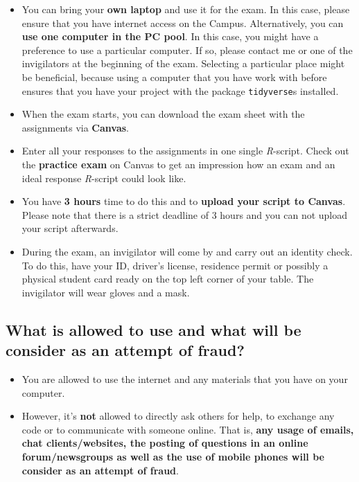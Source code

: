 \documentclass[
]{scrartcl}
\providecommand{\tightlist}{%
  \setlength{\itemsep}{0pt}\setlength{\parskip}{0pt}}
\begin{document}
\begin{itemize}
\tightlist
\item
  You can bring your \textbf{own laptop} and use it for the exam. In this case, please ensure that you have internet access on the Campus. Alternatively, you can \textbf{use one computer in the PC pool}. In this case, you might have a preference to use a particular computer. If so, please contact me or one of the invigilators at the beginning of the exam. Selecting a particular place might be beneficial, because using a computer that you have work with before ensures that you have your project with the package \texttt{tidyverse}s installed.
\item
  When the exam starts, you can download the exam sheet with the assignments via \textbf{Canvas}.
\item
  Enter all your responses to the assignments in one single \emph{R}-script. Check out the \textbf{practice exam} on Canvas to get an impression how an exam and an ideal response \emph{R}-script could look like.
\item
  You have \textbf{3 hours} time to do this and to \textbf{upload your script to Canvas}. Please note that there is a strict deadline of 3 hours and you can not upload your script afterwards.
\item
  During the exam, an invigilator will come by and carry out an identity check. To do this, have your ID, driver's license, residence permit or possibly a physical student card ready on the top left corner of your table. The invigilator will wear gloves and a mask.
\end{itemize}

\subsection*{What is allowed to use and what will be consider as an attempt of fraud?}\label{what-is-allowed-to-use-and-what-will-be-consider-as-an-attempt-of-fraud}

\begin{itemize}
\tightlist
\item
  You are allowed to use the internet and any materials that you have on your computer.
\item
  However, it's \textbf{not} allowed to directly ask others for help, to exchange any code or to communicate with someone online. That is, \textbf{any usage of emails, chat clients/websites, the posting of questions in an online forum/newsgroups as well as the use of mobile phones will be consider as an attempt of fraud}.
\end{itemize}
\end{document}
